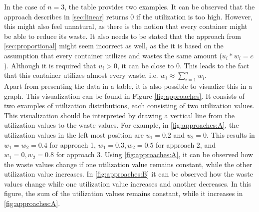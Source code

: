 \noindent
In the case of $n = 3$, the table provides two examples. It can be observed that the approach describes in \autoref{sec:linear} returns $0$ if the utilization is too high. However, this might also feel unnatural, as there is the notion that every container might be able to reduce its waste. It also needs to be stated that the approach from \autoref{sec:proportional} might seem incorrect as well, as the it is based on the assumption that every container utilizes and wastes the same amount ($u_i * w_i = c$). Although it is required that $u_i > 0$, it can be close to $0$. This leads to the fact that this container utilizes almost every waste, i.e. $w_i \approx \sum_{i=1}^n w_i$.\\

\noindent
Apart from presenting the data in a table, it is also possible to visualize this in a graph. This visualization can be found in Figure \ref{fig:approaches}. It consists of two examples of utilization distributions, each consisting of two utilization values. This visualization should be interpreted by drawing a vertical line from the utilization values to the waste values. For example, in \autoref{fig:approaches:A}, the utilization values in the left most position are $u_1 = 0.2$ and $u_2 = 0$. This results in $w_1 = w_2 = 0.4$ for approach 1, $w_1 = 0.3, w_2 = 0.5$ for approach 2, and $w_1 = 0, w_2 = 0.8$ for approach 3. Using \autoref{fig:approaches:A}, it can be observed how the waste values change if one utilization value remains constant, while the other utilization value increases. In \autoref{fig:approaches:B} it can be observed how the waste values change while one utilization value increases and another decreases. In this figure, the sum of the utilization values remains constant, while it increases in \autoref{fig:approaches:A}.

